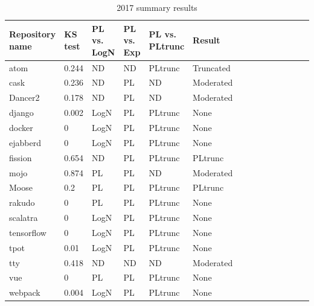\documentclass[conference]{IEEEtran}
\begin{document}
\begin{table}[htbp]
	\caption{2017 summary results}
\begin{center}
	\begin{tabular}{| p{0.12\linewidth} | p{0.08\linewidth} | p{0.08\linewidth} | p{0.06\linewidth} | p{0.1\linewidth} |p{0.13\linewidth} | p{0.5\linewidth} |}
		\hline
		Repository name & KS test & PL vs. LogN & PL vs. Exp & PL vs. PLtrunc & Result \\ 
		\hline
		atom & 0.244 &ND & ND &PLtrunc & Truncated \\ 
		cask & 0.236 &ND & PL & ND & Moderated \\
		Dancer2 &0.178 &ND &PL &ND & Moderated \\
		django &0.002 &LogN &PL &PLtrunc &None\\
		docker &0 &LogN &PL &PLtrunc &None\\
		ejabberd &0 &LogN &PL &PLtrunc &None\\
		fission &0.654 &ND &PL &PLtrunc &PLtrunc\\
		mojo &0.874 &PL &PL &ND & Moderated \\
		Moose &0.2 &PL &PL &PLtrunc & PLtrunc\\
		rakudo &0 &PL &PL &PLtrunc & None\\
		scalatra &0 &LogN &PL &PLtrunc & None\\
		tensorflow &0 &LogN &PL &PLtrunc & None\\
		tpot &0.01 &LogN &PL &PLtrunc &None\\
		tty &0.418 &ND &ND &ND & Moderated \\
		vue &0 &PL &PL &PLtrunc & None\\
		webpack &0.004 &LogN &PL & PLtrunc & None\\
		\hline
	\end{tabular}
\end{center}
\label{tab:2017tests}
\end{table}

\end{document}
